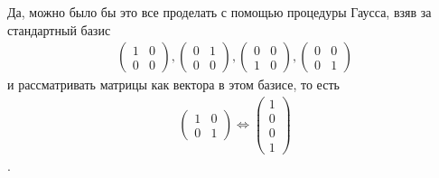 \begin{remark}
    Да, можно было бы это все проделать с помощью процедуры Гаусса, взяв за стандартный базис 
    \begin{gather}
        \begin{pmatrix}
            1 & 0 \\ 0 & 0
        \end{pmatrix},
        \begin{pmatrix}
            0 & 1 \\ 0 & 0
        \end{pmatrix},
        \begin{pmatrix}
            0 & 0 \\ 1 & 0
        \end{pmatrix},
        \begin{pmatrix}
            0 & 0 \\ 0 & 1
        \end{pmatrix}
    \end{gather}
    и рассматривать матрицы как вектора в этом базисе, то есть
    \begin{gather}
        \begin{pmatrix}
            1 & 0 \\
            0 & 1
        \end{pmatrix} \Leftrightarrow 
        \begin{pmatrix}
            1 \\ 0 \\ 0 \\ 1
        \end{pmatrix}
    \end{gather}.
\end{remark}